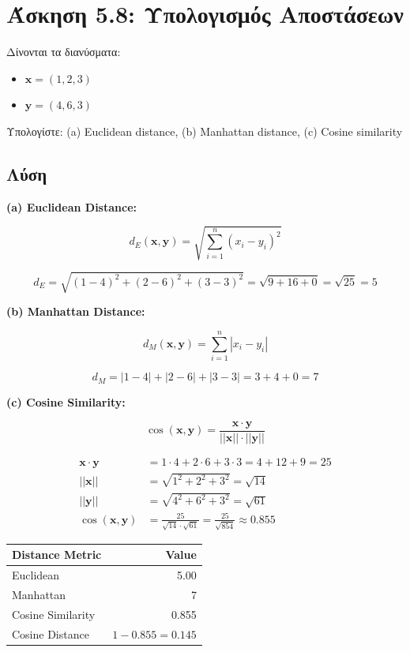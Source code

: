 \section{Άσκηση 5.8: Υπολογισμός Αποστάσεων}

\begin{formulabox}[Εκφώνηση]
Δίνονται τα διανύσματα:
\begin{itemize}
    \item $\mathbf{x} = (1, 2, 3)$
    \item $\mathbf{y} = (4, 6, 3)$
\end{itemize}

Υπολογίστε: (a) Euclidean distance, (b) Manhattan distance, (c) Cosine similarity
\end{formulabox}

\subsection*{Λύση}

\textbf{(a) Euclidean Distance:}

$$d_E(\mathbf{x}, \mathbf{y}) = \sqrt{\sum_{i=1}^{n} (x_i - y_i)^2}$$

$$d_E = \sqrt{(1-4)^2 + (2-6)^2 + (3-3)^2} = \sqrt{9 + 16 + 0} = \sqrt{25} = 5$$

\textbf{(b) Manhattan Distance:}

$$d_M(\mathbf{x}, \mathbf{y}) = \sum_{i=1}^{n} |x_i - y_i|$$

$$d_M = |1-4| + |2-6| + |3-3| = 3 + 4 + 0 = 7$$

\textbf{(c) Cosine Similarity:}

$$\cos(\mathbf{x}, \mathbf{y}) = \frac{\mathbf{x} \cdot \mathbf{y}}{||\mathbf{x}|| \cdot ||\mathbf{y}||}$$

\begin{align*}
\mathbf{x} \cdot \mathbf{y} &= 1 \cdot 4 + 2 \cdot 6 + 3 \cdot 3 = 4 + 12 + 9 = 25 \\
||\mathbf{x}|| &= \sqrt{1^2 + 2^2 + 3^2} = \sqrt{14} \\
||\mathbf{y}|| &= \sqrt{4^2 + 6^2 + 3^2} = \sqrt{61} \\
\cos(\mathbf{x}, \mathbf{y}) &= \frac{25}{\sqrt{14} \cdot \sqrt{61}} = \frac{25}{\sqrt{854}} \approx 0.855
\end{align*}

\begin{center}
\begin{tabular}{lr}
\toprule
\textbf{Distance Metric} & \textbf{Value} \\
\midrule
Euclidean & 5.00 \\
Manhattan & 7 \\
Cosine Similarity & 0.855 \\
Cosine Distance & $1 - 0.855 = 0.145$ \\
\bottomrule
\end{tabular}
\end{center}
